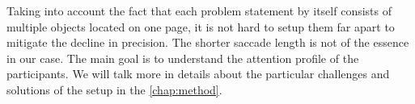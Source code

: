 Taking into account the fact that each problem statement by itself consists of multiple objects located on one page, it is not hard to setup them far apart to mitigate the decline in precision. The shorter saccade length is not of the essence in our case. The main goal is to understand the attention profile of the participants. We will talk more in details about the particular challenges and solutions of the setup in the \autoref{chap:method}.
